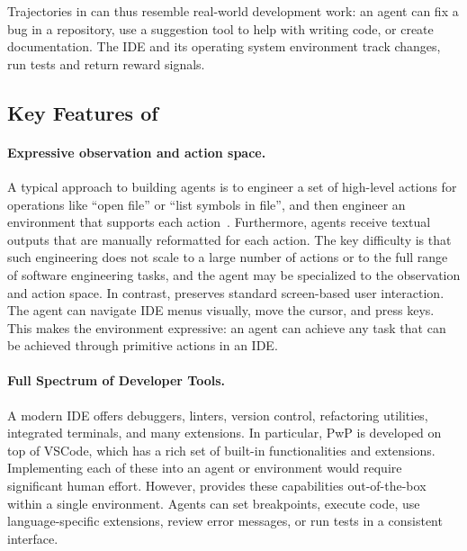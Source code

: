Trajectories in \ours{} can thus resemble real-world development work: an agent can fix a bug in a repository, use a suggestion tool to help with writing code, or create documentation.
The IDE and its operating system environment track changes, run tests and return reward signals.




\subsection{Key Features of \Ours{}}



\paragraph{Expressive observation and action space.}
A typical approach to building agents is to engineer a set of high-level actions for operations like ``open file'' or ``list symbols in file'', and then engineer an environment that supports each action~\cite{xia2024agentlessdemystifyingllmbasedsoftware,yang2024swebenchmultimodalaisystems,wang2024openhandsopenplatformai}.
Furthermore, agents receive textual outputs that are manually reformatted for each action. The key difficulty is that such engineering does not scale to a large number of actions or to the full range of software engineering tasks, and the agent may be specialized to the observation and action space.
In contrast, \ours{} preserves standard screen-based user interaction.
The agent can navigate IDE menus visually, move the cursor, and press keys.
This makes the environment expressive: an agent can achieve any task that can be achieved through primitive actions in an IDE.

\paragraph{Full Spectrum of Developer Tools.}
A modern IDE offers debuggers, linters, version control, refactoring utilities,  integrated terminals, and many extensions.
In particular, PwP is developed on top of VSCode, which has a rich set of built-in functionalities and extensions.
Implementing each of these into an agent or environment would require significant human effort.
However, \ours{} provides these capabilities out-of-the-box within a single environment.
Agents can set breakpoints, execute code, use language-specific extensions, review error messages, or run tests in a consistent interface.

